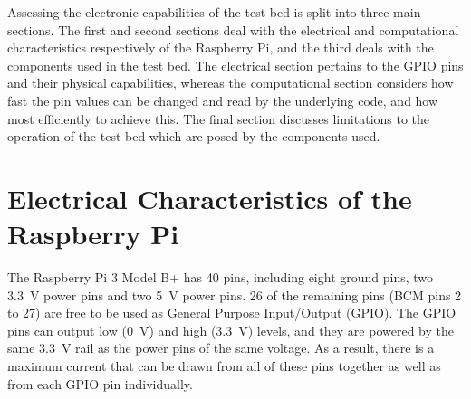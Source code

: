 \documentclass[../main.tex]{subfiles}
\begin{document}
Assessing the electronic capabilities of the test bed is split into three main sections.
The first and second sections deal with the electrical and computational characteristics respectively of the Raspberry Pi, and the third deals with the components used in the test bed.
The electrical section pertains to the GPIO pins and their physical capabilities, whereas the computational section considers how fast the pin values can be changed and read by the underlying code, and how most efficiently to achieve this.
The final section discusses limitations to the operation of the test bed which are posed by the components used.\\


\section{Electrical Characteristics of the Raspberry Pi}

The Raspberry Pi 3 Model B+ has 40 pins, including eight ground pins, two \SI{3.3}{\volt} power pins and two \SI{5}{\volt} power pins.
26 of the remaining pins (BCM pins 2 to 27) are free to be used as General Purpose Input/Output (GPIO).
The GPIO pins can output low (\SI{0}{\volt}) and high (\SI{3.3}{\volt}) levels, and they are powered by the same \SI{3.3}{\volt} rail as the power pins of the same voltage.
As a result, there is a maximum current that can be drawn from all of these pins together as well as from each GPIO pin individually.\\
\end{document}
